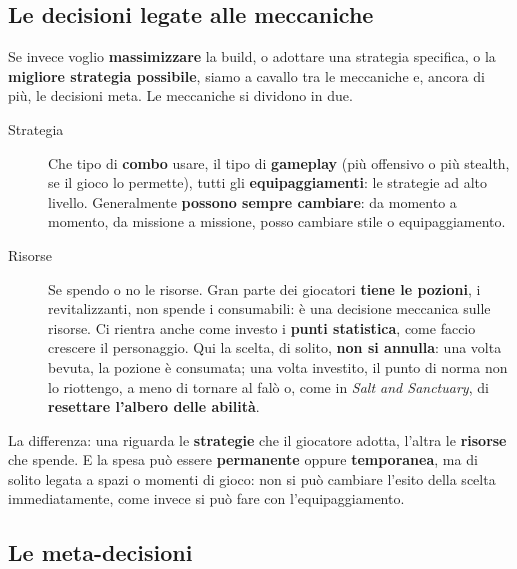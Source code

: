 \subsection{Le decisioni legate alle meccaniche}

Se invece voglio \textbf{massimizzare} la build, o adottare una strategia
specifica, o la \textbf{migliore strategia possibile}, siamo a cavallo tra
le meccaniche e, ancora di più, le decisioni meta. Le meccaniche si
dividono in due.
\begin{description}
  \item[Strategia] Che tipo di \textbf{combo} usare, il tipo di
        \textbf{gameplay} (più offensivo o più stealth, se il gioco lo
        permette), tutti gli \textbf{equipaggiamenti}: le strategie ad alto
        livello. Generalmente \textbf{possono sempre cambiare}: da momento a
        momento, da missione a missione, posso cambiare stile o
        equipaggiamento.
  \item[Risorse] Se spendo o no le risorse. Gran parte dei giocatori
        \textbf{tiene le pozioni}, i revitalizzanti, non spende i
        consumabili: è una decisione meccanica sulle risorse. Ci rientra
        anche come investo i \textbf{punti statistica}, come faccio crescere
        il personaggio. Qui la scelta, di solito, \textbf{non si annulla}:
        una volta bevuta, la pozione è consumata; una volta investito, il
        punto di norma non lo riottengo, a meno di tornare al falò o, come in
        \emph{Salt and Sanctuary}, di \textbf{resettare l'albero delle
        abilità}.
\end{description}
La differenza: una riguarda le \textbf{strategie} che il giocatore adotta,
l'altra le \textbf{risorse} che spende. E la spesa può essere
\textbf{permanente} oppure \textbf{temporanea}, ma di solito legata a spazi o
momenti di gioco: non si può cambiare l'esito della scelta immediatamente,
come invece si può fare con l'equipaggiamento.

\subsection{Le meta-decisioni}

